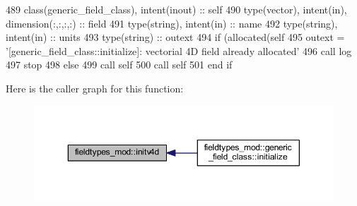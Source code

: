 \begin{DoxyCode}
489     \textcolor{keywordtype}{class}(generic\_field\_class), \textcolor{keywordtype}{intent(inout)} :: self
490     \textcolor{keywordtype}{type}(vector), \textcolor{keywordtype}{intent(in)}, \textcolor{keywordtype}{dimension(:,:,:,:)} :: field
491     \textcolor{keywordtype}{type}(string), \textcolor{keywordtype}{intent(in)} :: name
492     \textcolor{keywordtype}{type}(string), \textcolor{keywordtype}{intent(in)} :: units
493     \textcolor{keywordtype}{type}(string) :: outext
494     \textcolor{keywordflow}{if} (\textcolor{keyword}{allocated}(self%
495         outext = \textcolor{stringliteral}{'[generic\_field\_class::initialize]: vectorial 4D field already allocated'}
496         \textcolor{keyword}{call }log%
497         stop
498     \textcolor{keywordflow}{else}
499         \textcolor{keyword}{call }self%
500         \textcolor{keyword}{call }self%
501 \textcolor{keywordflow}{    end if}
\end{DoxyCode}
Here is the caller graph for this function\+:\nopagebreak
\begin{figure}[H]
\begin{center}
\leavevmode
\includegraphics[width=350pt]{namespacefieldtypes__mod_a08d665678bea0956a323d08863e164e5_icgraph}
\end{center}
\end{figure}
\mbox{\label{namespacefieldtypes__mod_ac3e3d9aabba3893d61583e890e3bdf41}} 
